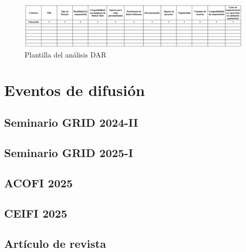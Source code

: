 \begin{figure}[htbp]
    \centering
    \includegraphics[width=\textwidth,height=0.85\textheight,keepaspectratio]{apendices/plantilla-DAR.png}
    \caption{Plantilla del análisis DAR}\label{fig:tabla-plantilla-dar}
\end{figure}
\FloatBarrier\chapter{Eventos de difusión}
\section*{Seminario GRID 2024-II}


\section*{Seminario GRID 2025-I}

\section*{ACOFI 2025}

\section*{CEIFI 2025}

\section*{Artículo de revista}